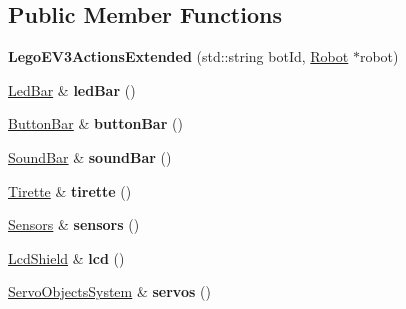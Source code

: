 \subsection*{Public Member Functions}
\begin{DoxyCompactItemize}
\item 
\mbox{\label{classLegoEV3ActionsExtended_ab15f0f888b435a02f86a3535524cffbb}} 
{\bfseries Lego\+E\+V3\+Actions\+Extended} (std\+::string bot\+Id, \hyperlink{classRobot}{Robot} $\ast$robot)
\item 
\mbox{\label{classLegoEV3ActionsExtended_a4c62dffbf655919aec07f54e8ae73521}} 
\hyperlink{classLedBar}{Led\+Bar} \& {\bfseries led\+Bar} ()
\item 
\mbox{\label{classLegoEV3ActionsExtended_af3da4fbbc5c7754dbf9b81a5bf49992c}} 
\hyperlink{classButtonBar}{Button\+Bar} \& {\bfseries button\+Bar} ()
\item 
\mbox{\label{classLegoEV3ActionsExtended_ad5ceac1b1c40b430157d9322a36c6b8e}} 
\hyperlink{classSoundBar}{Sound\+Bar} \& {\bfseries sound\+Bar} ()
\item 
\mbox{\label{classLegoEV3ActionsExtended_a86173274007a361ca398e4e97776e59e}} 
\hyperlink{classTirette}{Tirette} \& {\bfseries tirette} ()
\item 
\mbox{\label{classLegoEV3ActionsExtended_a2cc169db74632252e6e1f0ddef96ad70}} 
\hyperlink{classSensors}{Sensors} \& {\bfseries sensors} ()
\item 
\mbox{\label{classLegoEV3ActionsExtended_ac1482fa5e59d96c70d03993ddc12cdf5}} 
\hyperlink{classLcdShield}{Lcd\+Shield} \& {\bfseries lcd} ()
\item 
\mbox{\label{classLegoEV3ActionsExtended_a6a8c667ba96a506b826a2101c6b3fd74}} 
\hyperlink{classServoObjectsSystem}{Servo\+Objects\+System} \& {\bfseries servos} ()
\item 
\mbox{\label{classLegoEV3ActionsExtended_a63dca1304e1c41b8712dd3a9f78fd8c9}} 

\end{DoxyCompactItemize}
